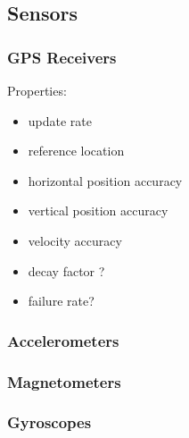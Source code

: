 \subsection{Sensors}
    \subsubsection{GPS Receivers}
        Properties:
        \begin{itemize}
            \item update rate
            \item reference location
            \item horizontal position accuracy
            \item vertical position accuracy
            \item velocity accuracy
            \item decay factor ?
            \item failure rate?
        \end{itemize}



    \subsubsection{Accelerometers}

    \subsubsection{Magnetometers}


    \subsubsection{Gyroscopes}

